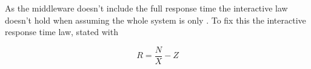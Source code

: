 
        As the middleware doesn't include the full response time the interactive law doesn't hold when assuming the
        whole system is only \mw{} \textendash{} \srv. To fix this the interactive response time law, stated with

        $$ R = \frac{N}{X} - Z $$


